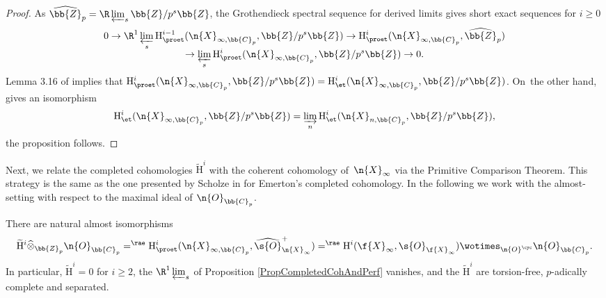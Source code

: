 \begin{proof}
As $\widehat{\bb{Z}}_p = \R \varprojlim_s \bb{Z}/p^s \bb{Z}$, the Grothendieck spectral sequence for derived limits gives short exact sequences for $i\geq 0$\vspace*{-3pt}
\begin{multline*}
0\to \R^1 \varprojlim_s \mathrm{H}^{i-1}_{\proet}(\n{X}_{\infty, \bb{C}_p}, \bb{Z}/p^s \bb{Z}) \to \mathrm{H}^i_{\proet}(\n{X}_{\infty, \bb{C}_p}, \widehat{\bb{Z}}_p)\\[-5pt]
\to \varprojlim_s \mathrm{H}^{i}_{\proet}(\n{X}_{\infty, \bb{C}_p}, \bb{Z}/p^s \bb{Z}) \to 0.
\end{multline*}
Lemma 3.16 of \cite{MR3090230} implies that $\mathrm{H}^{i}_{\proet}(\n{X}_{\infty, \bb{C}_p}, \bb{Z}/p^s \bb{Z}) =\mathrm{H}^{i}_{\et}(\n{X}_{\infty, \bb{C}_p}, \bb{Z}/p^s \bb{Z}) $. On~the other hand, \cite[Cor.\,7.18]{MR3090258} gives an isomorphism
\[
\mathrm{H}_{\et}^i(\n{X}_{\infty, \bb{C}_p}, \bb{Z}/p^s\bb{Z})= \varinjlim_{n} \mathrm{H}_{\et}^i(\n{X}_{n, \bb{C}_p}, \bb{Z}/p^s\bb{Z}),
\]
the proposition follows.
\end{proof}

Next, we relate the completed cohomologies $\widetilde{\mathrm{H}}^i$ with the coherent cohomology of~$\n{X}_{\infty}$ via the Primitive Comparison Theorem. This strategy is the same as the one presented by Scholze in \cite[Ch.\,IV]{scholzeTorsCoho2015} for Emerton's completed cohomology. In the following we work with the almost-setting with respect to the maximal ideal of $\n{O}_{\bb{C}_p}$.

\begin{prop}
\label{PropCompletedCoherent}
There are natural almost isomorphisms
\begin{equation}
\label{eqIsopcoho}
\widetilde{\mathrm{H}}^i \widehat{\otimes }_{\bb{Z}_p} \n{O}_{\bb{C}_p} =^{\rae} \mathrm{H}^i_{\proet}(\n{X}_{\infty, \bb{C}_p} , \widehat{\s{O}}^+_{\n{X}_{\infty}}) =^{\rae} \mathrm{H}^i(\f{X}_{\infty}, \s{O}_{\f{X}_{\infty}}) \wotimes_{\n{O}^{\cyc}} \n{O}_{\bb{C}_p}.
\end{equation}
In particular, $\widetilde{\mathrm{H}}^i=0$ for $i\geq 2$, the $\R^1 \varprojlim_s$ of Proposition \ref{PropCompletedCohAndPerf} vanishes, and the $\widetilde{\mathrm{H}}^i$ are torsion-free, $p$-adically complete and separated.
\end{prop}


